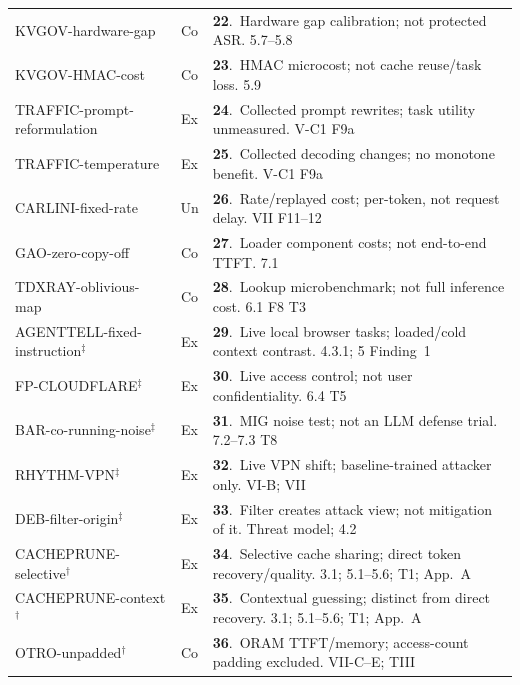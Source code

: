 \begin{table}[p]
\begin{minipage}[t]{0.495\textwidth}
\begin{tabularx}{\linewidth}{@{}p{.36\linewidth}cY@{}}
\textsf{KVGOV-hardware-gap}~\cite{addagada2026kvgov} & Co & \textbf{22}.~Hardware gap calibration; not protected ASR. 5.7--5.8\\
\textsf{KVGOV-HMAC-cost}~\cite{addagada2026kvgov} & Co & \textbf{23}.~HMAC microcost; not cache reuse/task loss. 5.9\\
\textsf{TRAFFIC-prompt-reformulation}~\cite{pouryousef2026traffic} & Ex & \textbf{24}.~Collected prompt rewrites; task utility unmeasured. V-C1 F9a\\
\textsf{TRAFFIC-temperature}~\cite{pouryousef2026traffic} & Ex & \textbf{25}.~Collected decoding changes; no monotone benefit. V-C1 F9a\\
\textsf{CARLINI-fixed-rate}~\cite{carlini2024remote} & Un & \textbf{26}.~Rate/replayed cost; per-token, not request delay. VII F11--12\\
\textsf{GAO-zero-copy-off}~\cite{gao2025iknow} & Co & \textbf{27}.~Loader component costs; not end-to-end TTFT. 7.1\\
\textsf{TDXRAY-oblivious-map}~\cite{hornetz2026tdxray} & Co & \textbf{28}.~Lookup microbenchmark; not full inference cost. 6.1 F8 T3\\
\textsf{AGENTTELL-fixed-instruction}$^{\ddagger}$~\cite{shahriar2026agenttell} & Ex & \textbf{29}.~Live local browser tasks; loaded/cold context contrast. 4.3.1; 5 Finding~1\\
\textsf{FP-CLOUDFLARE}$^{\ddagger}$~\cite{wang2026fpagent} & Ex & \textbf{30}.~Live access control; not user confidentiality. 6.4 T5\\
\textsf{BAR-co-running-noise}$^{\ddagger}$~\cite{gu2026behindbars} & Ex & \textbf{31}.~MIG noise test; not an LLM defense trial. 7.2--7.3 T8\\
\textsf{RHYTHM-VPN}$^{\ddagger}$~\cite{alhazbi2025rhythm} & Ex & \textbf{32}.~Live VPN shift; baseline-trained attacker only. VI-B; VII\\
\textsf{DEB-filter-origin}$^{\ddagger}$~\cite{debenedetti2024privacy} & Ex & \textbf{33}.~Filter creates attack view; not mitigation of it. Threat model; 4.2\\
\textsf{CACHEPRUNE-selective}$^{\dagger}$~\cite{wu2026cacheprune} & Ex & \textbf{34}.~Selective cache sharing; direct token recovery/quality. 3.1; 5.1--5.6; T1; App.~A\\
\textsf{CACHEPRUNE-context}$^{\dagger}$~\cite{wu2026cacheprune} & Ex & \textbf{35}.~Contextual guessing; distinct from direct recovery. 3.1; 5.1--5.6; T1; App.~A\\
\textsf{OTRO-unpadded}$^{\dagger}$~\cite{lee2026otro} & Co & \textbf{36}.~ORAM TTFT/memory; access-count padding excluded. VII-C--E; TIII\\

\end{tabularx}
\end{minipage}
\end{table}
